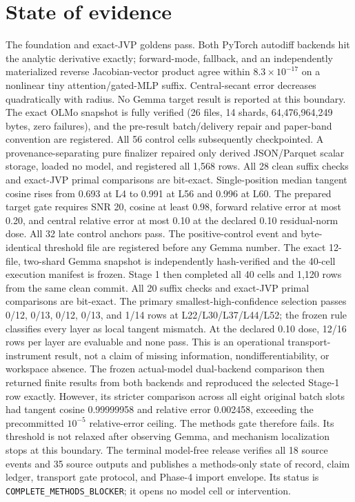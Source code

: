 \documentclass[11pt]{article}
\begin{document}
\section{State of evidence}
The foundation and exact-JVP goldens pass. Both PyTorch autodiff backends hit
the analytic derivative exactly; forward-mode, fallback, and an independently
materialized reverse Jacobian-vector product agree within $8.3\times10^{-17}$
on a nonlinear tiny attention/gated-MLP suffix. Central-secant error decreases
quadratically with radius. No Gemma target result is reported at this
boundary. The exact OLMo snapshot is fully verified (26 files, 14 shards,
64,476,964,249 bytes, zero failures), and the pre-result batch/delivery repair
and paper-band convention are registered. All 56 control cells subsequently
checkpointed. A provenance-separating pure finalizer repaired only derived
JSON/Parquet scalar storage, loaded no model, and registered all 1,568 rows.
All 28 clean suffix checks and exact-JVP primal comparisons are bit-exact.
Single-position median tangent cosine rises from 0.693 at L4 to 0.991 at L56
and 0.996 at L60. The prepared target gate requires SNR 20, cosine at least
0.98, forward relative error at most 0.20, and central relative error at most
0.10 at the declared 0.10 residual-norm dose. All 32 late control anchors
pass. The positive-control event and byte-identical threshold file are
registered before any Gemma number. The exact 12-file, two-shard Gemma
snapshot is independently hash-verified and the 40-cell execution manifest is
frozen. Stage 1 then completed all 40 cells and 1,120 rows from the same clean
commit. All 20 suffix checks and exact-JVP primal comparisons are bit-exact.
The primary smallest-high-confidence selection passes 0/12, 0/13, 0/12,
0/13, and 1/14 rows at L22/L30/L37/L44/L52; the frozen rule classifies every
layer as local tangent mismatch. At the declared 0.10 dose, 12/16 rows per
layer are evaluable and none pass. This is an operational transport-instrument
result, not a claim of missing information, nondifferentiability, or workspace
absence. The frozen actual-model dual-backend comparison then returned finite
results from both backends and reproduced the selected Stage-1 row exactly.
However, its stricter comparison across all eight original batch slots had
tangent cosine 0.99999958 and relative error 0.002458, exceeding the
precommitted $10^{-5}$ relative-error ceiling. The methods gate therefore
fails. Its threshold is not relaxed after observing Gemma, and mechanism
localization stops at this boundary.
The terminal model-free release verifies all 18 source events and 35 source
outputs and publishes a methods-only state of record, claim ledger, transport
gate protocol, and Phase-4 import envelope. Its status is
\texttt{COMPLETE\_METHODS\_BLOCKER}; it opens no model cell or intervention.
\end{document}
